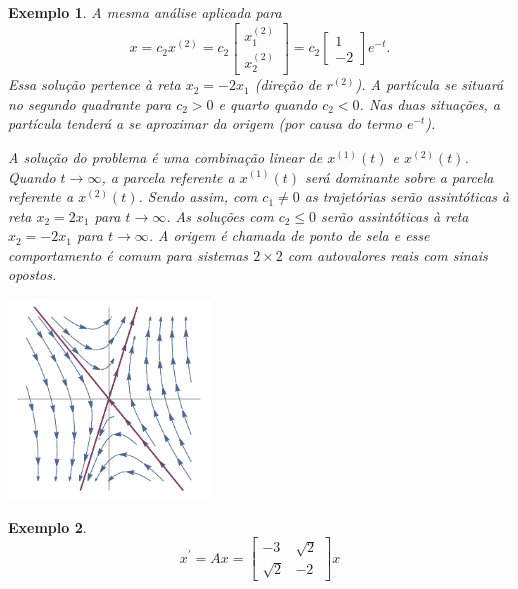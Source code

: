 \documentclass[a4paper,portuguese,9pt,final]{extarticle}
\newtheorem{example}{Exemplo}[section]
\begin{document}
\begin{multicols*}{2}
\begin{example}
                A mesma análise aplicada para $$x = c_2 x^{(2)} = c_2\begin{bmatrix} x_1^{(2)} \\ x_2^{(2)} \end{bmatrix} = c_2 \begin{bmatrix} 1\\ -2 \end{bmatrix} e^{-t}.$$ Essa solução pertence à reta  $x_2 = -2x_1$ (direção de $r^{(2)}$). A partícula se situará no segundo quadrante para $c_2 >0$ e quarto quando $c_2 <0$. Nas duas situações, a partícula tenderá a se aproximar da origem (por causa do termo $e^{-t}$). 
                
                A solução do problema é uma combinação linear de $x^{(1)}(t)$ e $x^{(2)}(t)$.  Quando $t \rightarrow \infty$, a parcela referente a $x^{(1)}(t)$ será dominante sobre a parcela referente a $x^{(2)}(t)$. Sendo assim, com $c_1 \neq 0$ as trajetórias serão assintóticas à reta $x_2=2x_1$ para $t \rightarrow \infty$. As soluções com $c_2 \leq 0$ serão assintóticas à reta $x_2=-2x_1$ para $t \rightarrow \infty$. A origem é chamada de ponto de sela e esse comportamento é comum para sistemas $2 \times 2$ com autovalores reais com sinais opostos.
        
                \includegraphics[width=0.4\textwidth]{fase_1}
                
                \end{example}
                
                \begin{example}
                
                    \begin{equation*}
                      x^\prime = Ax = \begin{bmatrix}
                                     -3 & \sqrt{2}\\
                                     \sqrt{2}& -2
                                     \end{bmatrix} x 
                    \end{equation*}
                    

\end{example}
\end{multicols*}
\end{document}
